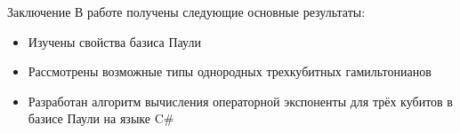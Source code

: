 \documentclass[9pt,pdf,hyperref={unicode=true}]{beamer}
\begin{document}

\begin{frame}[t]{Заключение}
В работе получены следующие основные результаты:
\vspace{0.4cm}
\begin{itemize}
\item{Изучены свойства базиса Паули}
\item{Рассмотрены возможные типы однородных трехкубитных гамильтонианов }
\item{Разработан алгоритм вычисления операторной экспоненты для трёх кубитов в базисе Паули на языке C$\#$}
\end{itemize}

\end{frame}
\end{document}

